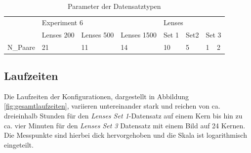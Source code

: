 \begin{table}
	\begin{tabularx}{\textwidth}{@{} XXXXXXXX @{}}
		\toprule
		& \multicolumn{3}{l}{Experiment 6} & \multicolumn{4}{l}{Lenses} \\
		\cmidrule(lr){2-4}
		\cmidrule(lr){5-8}
		& Lenses 200 & Lenses 500 & Lenses 1500 & Set 1 & Set2 & \multicolumn{2}{X}{Set 3} \\
		\hline
		\gls{N_Paare} & 21 & 11 & 14 & 10 & 5 & 1 & 2 \\
		\bottomrule
	\end{tabularx}
	\caption{Parameter der Datensatztypen}
	\label{tab:datasets}
\end{table}

\subsection{Laufzeiten}

Die Laufzeiten der Konfigurationen, dargestellt in Abbildung \ref{fig:gesamtlaufzeiten}, variieren untereinander stark und reichen von ca. dreieinhalb Stunden für den \textit{Lenses Set 1}-Datensatz auf einem Kern bis hin zu ca. vier Minuten für den \textit{Lenses Set 3} Datensatz mit einem Bild auf 24 Kernen. Die Messpunkte sind hierbei dick hervorgehoben und die Skala ist logarithmisch eingeteilt. 

